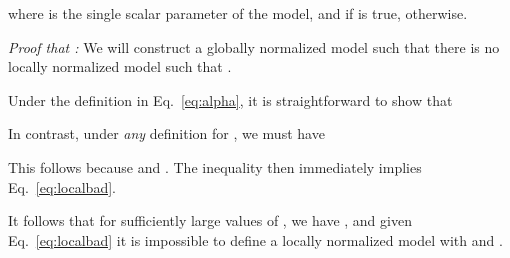 \documentclass[11pt]{article}
\begin{document}
where  is the single scalar parameter of the model,
and  if  is true,  otherwise.


{\em Proof that :} We
will construct a globally normalized model  such that there is
no locally normalized model such that .

Under the definition in Eq.~\eqref{eq:alpha},
it is straightforward to show that


In contrast, under {\em any} definition for , we must have

This follows because 
and .
The inequality  then immediately implies
Eq.~\eqref{eq:localbad}.

It follows that for sufficiently large values of , we have 
, and given Eq.~\eqref{eq:localbad}
it is impossible to define a locally normalized
model with  and .


\begin{table*}[t]
  \centering {}\caption{\label{tab:pos}
    Final POS tagging test set results on English WSJ and Treebank Union as well as CoNLL'09. We also show the performance of our pre-trained open source model, ``Parsey McParseface.''
}
\end{table*}
\end{document}
